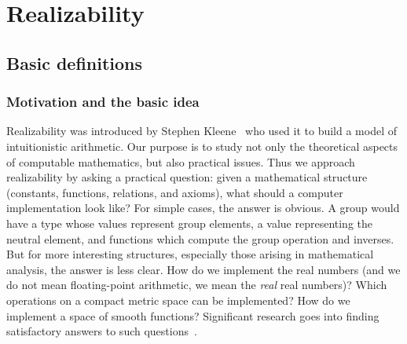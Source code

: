 \chapter{Realizability}
\label{chap:realizability}

\section{Basic definitions}
\label{sec:basic-definitions}

\subsection{Motivation and the basic idea}
\label{sec:realizability-basic-idea}

Realizability was introduced by Stephen Kleene~\cite{KleeneSC:intint}
who used it to build a model of intuitionistic arithmetic. Our purpose
is to study not only the theoretical aspects of computable
mathematics, but also practical issues. Thus we approach realizability
by asking a practical question: given a mathematical structure
(constants, functions, relations, and axioms), what should a computer
implementation look like? For simple cases, the answer is obvious. A
group would have a type whose values represent group elements, a value
representing the neutral element, and functions which compute the
group operation and inverses. But for more interesting structures,
especially those arising in mathematical analysis, the answer is less
clear. How do we implement the real numbers (and we do not mean
floating-point arithmetic, we mean the \emph{real} real numbers)?
Which operations on a compact metric space can be implemented? How do
we implement a space of smooth functions? Significant research goes
into finding satisfactory answers to such
questions~\cite{Wei00,TZ98,Bla97}.

